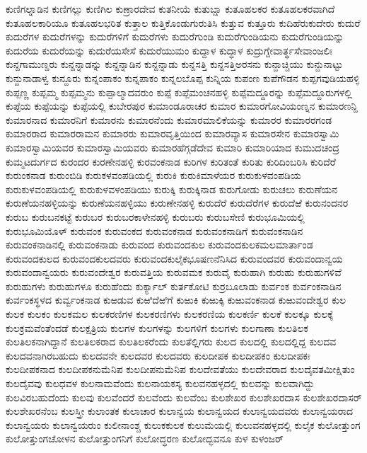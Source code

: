 {ಕುಣಿಗಲ್ನಾಡಿನ
ಕುಣಿಗಲ್ಲು
ಕುಣಿಗಿಲ
ಕುಣ್ರಾರದೇವ
ಕುತನೀಯೆ
ಕುತುಬ್ಷಾ
ಕುತೂಹಲಕರ
ಕುತೂಹಲಕರವಾಗಿದೆ
ಕುತೂಹಲಕಾರಿಯೂ
ಕುತೂಹಲಭರಿತ
ಕುತ್ತಾಲ
ಕುತ್ತಿಕೊಂಡುಗುರುತಿಸಿ
ಕುತ್ತುವ
ಕುತ್ತೂರು
ಕುದಿಹೆರುಕುದೇರು
ಕುದುರೆ
ಕುದುರೆಗಳ
ಕುದುರೆಗಳನ್ನು
ಕುದುರೆಗಳಿಗೆ
ಕುದುರೆಗಳು
ಕುದುರೆಗುಂಡಿ
ಕುದುರೆಗುಂಡಿಯನು
ಕುದುರೆಗುಂಡಿಯನ್ನು
ಕುದುರೆಯ
ಕುದುರೆಯನ್ನು
ಕುದುರೆಯಸೇಸೆ
ಕುದುರೆಯುಮಂ
ಕುದ್ದಾಳ
ಕುದ್ಧಾಳ
ಕುದ್ರುಗ್ದೇವಾರ್ತ್ಥಸೇವಾಂಜಲಿಃ
ಕುನ್ದಗಾಮುಣ್ಡರು
ಕುನ್ದನ್ನಾಡನ್ನು
ಕುನ್ದನ್ನಾಡಿನ
ಕುನ್ದನ್ನಾಡು
ಕುನ್ದಸತ್ತಿ
ಕುನ್ದಸತ್ತಿಅರಸನು
ಕುನ್ದಾಚ್ಚಿಯು
ಕುನ್ದುನಾಟ್ಟು
ಕುನ್ದುನಾಡಾಳ್ವ
ಕುನ್ದೂರು
ಕುನ್ನಂಪಾಕಂ
ಕುನ್ನಪಾಕಂ
ಕುನ್ನಲಬೊಪ್ಪ
ಕುನ್ನಿಯ
ಕುಪಂಣ
ಕುಪೆಗೌಡನ
ಕುಪ್ಪಗವುಡಿಯಹಳ್ಳಿ
ಕುಪ್ಪಣ್ಣ
ಕುಪ್ಪಮ್ಮ
ಕುಪ್ಪಮ್ಮನು
ಕುಪ್ಪಾಲ್ಮಾದವರುಂ
ಕುಪ್ಪೆ
ಕುಪ್ಪೆಮಂಚನಹಳ್ಳಿ
ಕುಪ್ಪೆಮದ್ದೂರನ್ನು
ಕುಪ್ಪೆಮದ್ದೂರುಗಳಲ್ಲಿ
ಕುಪ್ಪೆಯ
ಕುಪ್ಪೆಯನ್ನು
ಕುಪ್ಪೆಯಲ್ಲಿ
ಕುಬೇರಪುರ
ಕುಮಾಂಡೂರಾಚರ
ಕುಮಾರ
ಕುಮಾರಗೋವಿಯಂಣ್ನನ
ಕುಮಾರಣನ್ದಿ
ಕುಮಾರನಾದ
ಕುಮಾರನಿಗೆ
ಕುಮಾರನು
ಕುಮಾರನೆಂದು
ಕುಮಾರಮಾಲಿಕೆಯನ್ನು
ಕುಮಾರರ
ಕುಮಾರರಗಂಡ
ಕುಮಾರರಾದ
ಕುಮಾರರಾಮನ
ಕುಮಾರರು
ಕುಮಾರವೃತ್ತಿಯಿಂದ
ಕುಮಾರವ್ಯಾಸ
ಕುಮಾರಸೇನ
ಕುಮಾರಸ್ವಾಮಿ
ಕುಮಾರಸ್ವಾಮಿಯವರ
ಕುಮಾರಸ್ವಾಮಿಯವರು
ಕುಮಾರಹೆಗ್ಗಡೆದೇವ
ಕುಮಾರಿ
ಕುಮಾರಿಯಾದ
ಕುಮುದಚಂದ್ರ
ಕುಮ್ಮಟದುರ್ಗದ
ಕುರಂದರ
ಕುರಣೇನಹಳ್ಳಿ
ಕುರವಂಕನಾಡ
ಕುರಿಗಳ
ಕುರಿತಂತೆ
ಕುರಿತು
ಕುರಿದಿಂಬರಿಸಿ
ಕುರಿದೆರೆ
ಕುರುಂಕನಾಡ
ಕುರುಂಬಿಡಿ
ಕುರುಕಳವಂಪಡಿಯಲ್ಲಿ
ಕುರುಕಿ
ಕುರುಕಿಮಾಳೆಯರ
ಕುರುಕುಳವಂಪಡಿಯ
ಕುರುಕುಳವಂಪಡಿಯಲ್ಲಿ
ಕುರುಕುಳವಳಂಪಡಿಯು
ಕುರುಕ್ಕಿ
ಕುರುಕ್ಕಿನಾಡ
ಕುರುಗೋಡು
ಕುರುಚಲು
ಕುರುಣೆಯನ
ಕುರುಣೆಯನಹಳ್ಳಿಯನ್ನು
ಕುರುಣೆಯನಹಳ್ಳಿಯು
ಕುರುಣೇನಹಳ್ಳಿ
ಕುರುದೆರೆ
ಕುರುದೆರೆಗಳ
ಕುರುದೆಱೆ
ಕುರುನಂದನರ
ಕುರುಬ
ಕುರುಬನಕಟ್ಟೆ
ಕುರುಬರ
ಕುರುಬರಕಾಳೇನಹಳ್ಳಿ
ಕುರುಬರು
ಕುರುಬಸೇಣಿ
ಕುರುಭೂಮಿಯಲ್ಲಿ
ಕುರುಭೂಮಿಯೊಳ್
ಕುರುವಂಕ
ಕುರುವಂಕದ
ಕುರುವಂಕನಾಡ
ಕುರುವಂಕನಾಡಿಗೆ
ಕುರುವಂಕನಾಡಿನ
ಕುರುವಂಕನಾಡಿನಲ್ಲಿ
ಕುರುವಂಕನಾಡು
ಕುರುವಂದ
ಕುರುವಂದಕುಲ
ಕುರುವಂದಕುಲಕಮಲಮಾರ್ತಾಂಡ
ಕುರುವಂದಕುಲದ
ಕುರುವಂದಕುಲದವರು
ಕುರುವಂದಕುಲೈಕಭೂಷಣನೆನಿಸಿದ
ಕುರುವಂದವರ
ಕುರುವಂದಾನ್ವಯ
ಕುರುವಂದಾನ್ವಯರು
ಕುರುವಂದೇಶ್ವರ
ಕುರುವತ್ತಿಯ
ಕುರುವಮಕ
ಕುರುವೈ
ಕುರುಹಾಗಿ
ಕುರುಹು
ಕುರುಹುಗಳಿವೆ
ಕುರುಹುಗಳು
ಕುರುಹುಗಳೂ
ಕುರುಹೆಂದು
ಕುರ್ಕ್ಯಾಲ್
ಕುರ್ತಕೋಟಿ
ಕುರ್ರಬೂಲಾಡು
ಕುರ್ವಂಕ
ಕುರ್ವಂಕನಾಡಿನ
ಕುರ್ವಂಕಸ್ಥಳದ
ಕುರ್ವ್ವಂಕನಾಡ
ಕುಱಡುವ
ಕುಱಿದೆಱಿಗೆ
ಕುಱುಕಿ
ಕುಱುಕ್ಕಿ
ಕುಱುವಂಕನಾಡ
ಕುಱುವಂದೇಶ್ವರ
ಕುಲ
ಕುಲಕ
ಕುಲಕಂ
ಕುಲಕಮಲ
ಕುಲಕರಣಿಗಳ
ಕುಲಕರಣಿಗಳು
ಕುಲಕರಣಿಯ
ಕುಲಕರ್ಣಿ
ಕುಲಕೆ
ಕುಲಕ್ಕೂ
ಕುಲಕ್ಕೆ
ಕುಲಕ್ರಮವೆಂತೆಂದಡೆ
ಕುಲಕ್ಷತ್ರಿಯ
ಕುಲಗಳ
ಕುಲಗಳನ್ನು
ಕುಲಗಳಿಗೆ
ಕುಲಗಳು
ಕುಲಗಾಣಾ
ಕುಲತಿಲಕ
ಕುಲತಿಲಕನಾಗಿದ್ದಾನೆ
ಕುಲತಿಲಕರಾದ
ಕುಲತಿಲಕರೆಂದು
ಕುಲತೆಲ್ಲಿಗರು
ಕುಲದ
ಕುಲದಲ್ಲಿ
ಕುಲದಲ್ಲಿದ್ದ
ಕುಲದವ
ಕುಲದವನಾಗಿರಬಹುದು
ಕುಲದವನೇ
ಕುಲದವರ
ಕುಲದವರು
ಕುಲದೀಪಕ
ಕುಲದೀಪಕಂ
ಕುಲದೀಪಕಃ
ಕುಲದೀಪಕನಾದ
ಕುಲದೀಪಕನುಮೆನಿಪ
ಕುಲದೀಪನುಮೆನಿಪ
ಕುಲದೇವತೆಯು
ಕುಲದೇವರಾದ
ಕುಲದೈವತಮೀಕ್ಷಿತುಂ
ಕುಲದೈವವು
ಕುಲಧವಳ
ಕುಲನಾಮವೆಂದು
ಕುಲನಾಯಕಸ್ಯ
ಕುಲವನಹಳ್ಳದಲ್ಲಿ
ಕುಲವನ್ನು
ಕುಲವಾಗಿದ್ದು
ಕುಲವಿರಬಹುದೆಂದು
ಕುಲವು
ಕುಲವೆಂದರೆ
ಕುಲವೆಂದು
ಕುಲವೆಂಬ
ಕುಲಶೇಖರ
ಕುಲಶೇಖರದಾಸ
ಕುಲಶೇಖರದಾಸರ್
ಕುಲಶೇಖರನೆಂಬ
ಕುಲಸ್ತ್ರೀ
ಕುಲಾಂತಕ
ಕುಲಾಚಾರ
ಕುಲಾನ್ವಯ
ಕುಲಾನ್ವಯದ
ಕುಲಾನ್ವಯದವರು
ಕುಲಾನ್ವಯರಾದ
ಕುಲಾನ್ವಯರು
ಕುಲಾನ್ವಯರುಂ
ಕುಲೀನಾಂಶ್ಚ
ಕುಲುಕಕುಲಕ
ಕುಲುಮೆಯಲ್ಲಿ
ಕುಲುವನಹಳ್ಳದಲ್ಲಿ
ಕುಲೈಕ
ಕುಲೋತ್ತುಂಗ
ಕುಲೋತ್ತುಂಗಚೋಳನ
ಕುಲೋತ್ತುಂಗನಿಗೆ
ಕುಲೋದ್ಧರಣ
ಕುಲೋದ್ಭವನೂ
ಕುಳ
ಕುಳಂಜರ್
}
